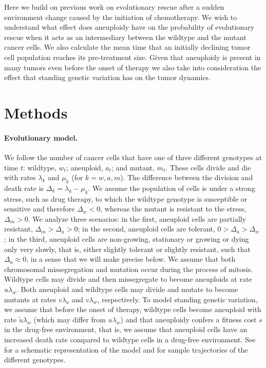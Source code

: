 \documentclass[12pt]{extarticle}
\begin{document}
Here we build on previous work on evolutionary rescue after a sudden environment change caused by the initiation of chemotherapy. We wish to understand what effect does aneuploidy have on the probability of evolutionary rescue when it acts as an intermediary between the wildtype and the mutant cancer cells. We also calculate the mean time that an initially declining tumor cell population reaches its pre-treatment size. Given that aneuploidy is present in many tumors even before the onset of therapy \citep{lukow2021chromosomal} we also take into consideration the effect that standing genetic variation has on the tumor dynamics.

\section*{Methods}

\paragraph{Evolutionary model.}
We follow the number of cancer cells that have one of three different genotypes at time $t$: wildtype, $w_t$; aneuploid, $a_t$; and mutant, $m_t$. 
These cells divide and die with rates $\lambda_k$ and $\mu_k$ (for $k=w, a, m$).
The difference between the division and death rate is $\Delta_k = \lambda_k-\mu_k$.
We assume the population of cells is under a strong stress, such as drug therapy, to which the wildtype genotype is susceptible or sensitive and therefore $\Delta_w<0$, whereas the mutant is resistant to the stress, $\Delta_m>0$.
We analyze three scenarios: in the first, aneuploid cells are partially resistant, $\Delta_m>\Delta_a>0$; in the second, aneuploid cells are tolerant, $0>\Delta_a>\Delta_w$ \citep[see][for the distinction between susceptible, resistant, and tolerant]{brauner2016distinguishing}; in the third, aneuploid cells are non-growing, stationary or growing or dying only very slowly, that is, either slightly tolerant or slightly resistant, such that $\Delta_a \approx 0$, in a sense that we will make precise below. 
We assume that both chromosomal missegregation and mutation occur during the process of mitosis. 
Wildtype cells may divide and then missegregate to become aneuploids at rate $u\lambda_w$. Both aneuploid and wildtype cells may divide and mutate to become mutants at rates $v\lambda_{a}$ and $v\lambda_{w}$, respectively.
To model standing genetic variation, we assume that before the onset of therapy, wildtype cells become aneuploid with rate $\tilde{u}\lambda_w$ (which may differ from $u \lambda_w$) and that aneuploidy confers a fitness cost $s$ in the drug-free environment, that is, we assume that aneuploid cells have an increased death rate compared to wildtype cells in a drug-free environment.
See  for a schematic representation of the model and  for sample trajectories of the different genotypes. 
\end{document}
